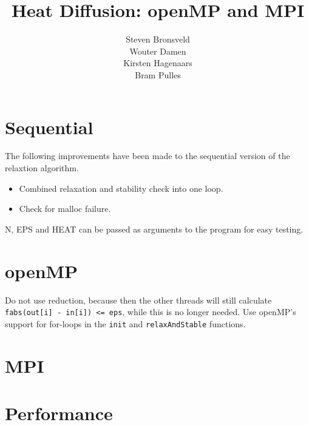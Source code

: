 \documentclass[a4paper]{article}
\author{Steven Bronsveld\\Wouter Damen\\Kirsten Hagenaars\\Bram Pulles}
\title{\textbf{Heat Diffusion: openMP and MPI}}
\begin{document}
\maketitle

\tableofcontents

\pagebreak
\section{Sequential}
The following improvements have been made to the sequential version of the relaxtion algorithm.
\begin{itemize}
    \item Combined relaxation and stability check into one loop.
    \item Check for malloc failure.
\end{itemize}
N, EPS and HEAT can be passed as arguments to the program for easy testing.

\section{openMP}
Do not use reduction, because then the other threads will still calculate \texttt{fabs(out[i] - in[i]) <= eps}, while this is no longer needed. Use openMP's support for for-loops in the \texttt{init} and \texttt{relaxAndStable} functions.

\section{MPI}

\section{Performance}
\end{document}
